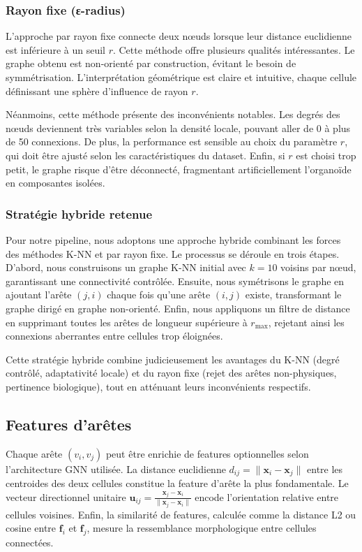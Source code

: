 \subsubsection{Rayon fixe (ε-radius)}

L'approche par rayon fixe connecte deux nœuds lorsque leur distance euclidienne est inférieure à un seuil $r$. Cette méthode offre plusieurs qualités intéressantes. Le graphe obtenu est non-orienté par construction, évitant le besoin de symmétrisation. L'interprétation géométrique est claire et intuitive, chaque cellule définissant une sphère d'influence de rayon $r$.

Néanmoins, cette méthode présente des inconvénients notables. Les degrés des nœuds deviennent très variables selon la densité locale, pouvant aller de 0 à plus de 50 connexions. De plus, la performance est sensible au choix du paramètre $r$, qui doit être ajusté selon les caractéristiques du dataset. Enfin, si $r$ est choisi trop petit, le graphe risque d'être déconnecté, fragmentant artificiellement l'organoïde en composantes isolées.

\subsubsection{Stratégie hybride retenue}

Pour notre pipeline, nous adoptons une approche hybride combinant les forces des méthodes K-NN et par rayon fixe. Le processus se déroule en trois étapes. D'abord, nous construisons un graphe K-NN initial avec $k = 10$ voisins par nœud, garantissant une connectivité contrôlée. Ensuite, nous symétrisons le graphe en ajoutant l'arête $(j,i)$ chaque fois qu'une arête $(i,j)$ existe, transformant le graphe dirigé en graphe non-orienté. Enfin, nous appliquons un filtre de distance en supprimant toutes les arêtes de longueur supérieure à $r_{\max}$, rejetant ainsi les connexions aberrantes entre cellules trop éloignées.

Cette stratégie hybride combine judicieusement les avantages du K-NN (degré contrôlé, adaptativité locale) et du rayon fixe (rejet des arêtes non-physiques, pertinence biologique), tout en atténuant leurs inconvénients respectifs.

\subsection{Features d'arêtes}

Chaque arête $(v_i, v_j)$ peut être enrichie de features optionnelles selon l'architecture GNN utilisée. La distance euclidienne $d_{ij} = \|\mathbf{x}_i - \mathbf{x}_j\|$ entre les centroides des deux cellules constitue la feature d'arête la plus fondamentale. Le vecteur directionnel unitaire $\mathbf{u}_{ij} = \frac{\mathbf{x}_j - \mathbf{x}_i}{\|\mathbf{x}_j - \mathbf{x}_i\|}$ encode l'orientation relative entre cellules voisines. Enfin, la similarité de features, calculée comme la distance L2 ou cosine entre $\mathbf{f}_i$ et $\mathbf{f}_j$, mesure la ressemblance morphologique entre cellules connectées.

